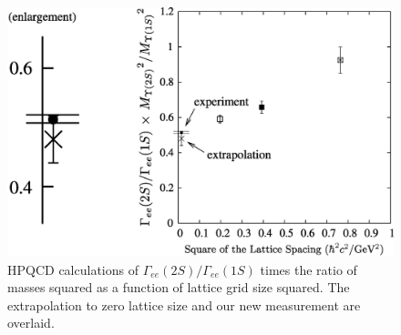 \documentclass{cornell}
\begin{document}
\begin{figure}[p]
  \begin{center}
    \includegraphics[width=\linewidth]{latticespacingagainagain}
  \end{center}
  \caption[Comparison of our $\Gamma_{ee}(2S)/\Gamma_{ee}(1S)$ with
  the HPQCD calculation]{\label{latticespacingagain} HPQCD
  calculations of $\Gamma_{ee}(2S)/\Gamma_{ee}(1S)$ times the ratio of
  masses squared as a function of lattice grid size squared.  The
  extrapolation to zero lattice size and our new measurement are
  overlaid.}
\end{figure}
\end{document}
